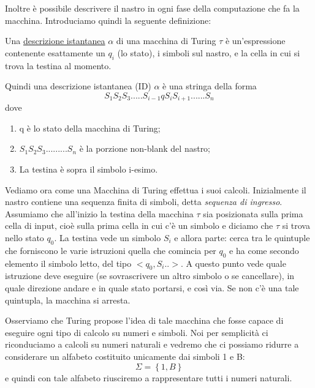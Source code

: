 Inoltre \`e possibile descrivere il nastro in ogni fase della
computazione che fa la macchina. Introduciamo quindi la seguente
definizione:

\begin{defi}
Una \underline{descrizione istantanea} $\alpha$ di una macchina di
Turing $\tau$ \`e un'espressione contenente esattamente un $q_{i}$ (lo
stato), i simboli sul nastro, e la cella in cui si trova la testina al
momento.
\end{defi}

Quindi una descrizione istantanea (ID) $\alpha$ \`e una stringa della
forma $$S_1S_2S_3.....S_{i-1}qS_{i}S_{i+1}......S_{n}$$ dove

\begin{enumerate}
\item q \`e lo stato della macchina di Turing;
\item $S_1S_2S_3.........S_{n}$ \`e la porzione non-blank del nastro;
\item La testina \`e sopra il simbolo i-esimo.
\end{enumerate}
\vspace{0.5cm}

Vediamo ora come una Macchina di Turing effettua i suoi
calcoli. Inizialmente il nastro contiene una sequenza finita di
simboli, detta \textsl{sequenza di ingresso}. Assumiamo che all'inizio
la testina della macchina $\tau$ sia posizionata sulla prima cella di
input, cio\`e sulla prima cella in cui c'\`e un simbolo e diciamo che
$\tau$ si trova nello stato $q_0$. La testina vede un simbolo $S_i$ e
allora parte: cerca tra le quintuple che forniscono le varie
istruzioni quella che comincia per $q_0$ e ha come secondo elemento il
simbolo letto, del tipo $<q_0,S_i..>$. A questo punto vede quale
istruzione deve eseguire (se sovrascrivere un altro simbolo o se
cancellare), in quale direzione andare e in quale stato portarsi, e
cos\`i via. Se non c'\`e una tale quintupla, la macchina si arresta.

Osserviamo che Turing propose l'idea di tale macchina che fosse capace
di eseguire ogni tipo di calcolo su numeri e simboli. Noi per
semplicit\`a ci riconduciamo a calcoli su numeri naturali e vedremo
che ci possiamo ridurre a considerare un alfabeto costituito
unicamente dai simboli 1 e B: $$\Sigma=\left\{1,B\right\}$$ e quindi
con tale alfabeto riusciremo a rappresentare tutti i numeri
naturali.

